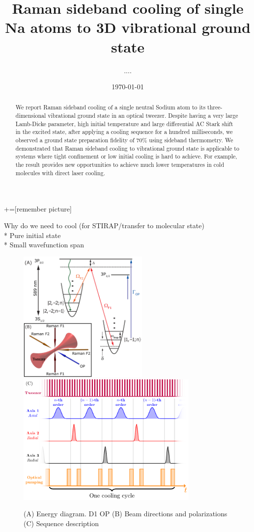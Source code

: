 \documentclass[aps,prl,twocolumn,groupedaddress]{revtex4-1}
\begin{document}
+=[remember picture]
\title{Raman sideband cooling of single Na atoms to 3D vibrational ground state}
\author{....}
\date{\today}

\begin{abstract}
  We report Raman sideband cooling of a single neutral Sodium atom to its three-dimensional
  vibrational ground state in an optical tweezer.
  Despite having a very large Lamb-Dicke parameter, high initial temperature and
  large differential AC Stark shift in the excited state,
  after applying a cooling sequence for a hundred milliseconds,
  we observed a ground state preparation fidelity of $70\%$ using sideband thermometry.
  We demonstrated that Raman sideband cooling to vibrational ground state is applicable to
  systems where tight confinement or low initial cooling is hard to achieve.
  For example, the result provides new opportunities to achieve much lower temperatures
  in cold molecules with direct laser cooling.
\end{abstract}

\maketitle

Why do we need to cool (for STIRAP/transfer to molecular state)\\

* Pure initial state\\
* Small wavefunction span\\

\begin{figure}
  \includegraphics[height=6.5cm]{imgs/Na_RSC_schematic.pdf}
  \includegraphics[height=6.5cm]{sequence.pdf}
  \caption{(A) Energy diagram. D1 OP
    (B) Beam directions and polarizations
    (C) Sequence description
    \label{f-setup}}
\end{figure}
\end{document}
